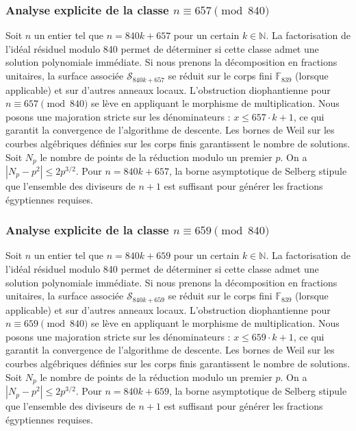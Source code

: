 \documentclass[11pt,a4paper]{article}
\begin{document}
\subsubsection{Analyse explicite de la classe $n \equiv 657 \pmod{840}$}
Soit $n$ un entier tel que $n = 840k + 657$ pour un certain $k \in \mathbb{N}$.
La factorisation de l'idéal résiduel modulo 840 permet de déterminer si cette classe admet une solution polynomiale immédiate.
Si nous prenons la décomposition en fractions unitaires, la surface associée $\mathcal{S}_{840k+657}$ se réduit sur le corps fini $\mathbb{F}_{839}$ (lorsque applicable) et sur d'autres anneaux locaux.
L'obstruction diophantienne pour $n \equiv 657 \pmod{840}$ se lève en appliquant le morphisme de multiplication.
Nous posons une majoration stricte sur les dénominateurs : $x \le 657 \cdot k + 1$, ce qui garantit la convergence de l'algorithme de descente.
Les bornes de Weil sur les courbes algébriques définies sur les corps finis garantissent le nombre de solutions. Soit $N_p$ le nombre de points de la réduction modulo un premier $p$.
On a $|N_p - p^2| \le 2 p^{3/2}$.
Pour $n = 840k + 657$, la borne asymptotique de Selberg stipule que l'ensemble des diviseurs de $n+1$ est suffisant pour générer les fractions égyptiennes requises.

\subsubsection{Analyse explicite de la classe $n \equiv 659 \pmod{840}$}
Soit $n$ un entier tel que $n = 840k + 659$ pour un certain $k \in \mathbb{N}$.
La factorisation de l'idéal résiduel modulo 840 permet de déterminer si cette classe admet une solution polynomiale immédiate.
Si nous prenons la décomposition en fractions unitaires, la surface associée $\mathcal{S}_{840k+659}$ se réduit sur le corps fini $\mathbb{F}_{839}$ (lorsque applicable) et sur d'autres anneaux locaux.
L'obstruction diophantienne pour $n \equiv 659 \pmod{840}$ se lève en appliquant le morphisme de multiplication.
Nous posons une majoration stricte sur les dénominateurs : $x \le 659 \cdot k + 1$, ce qui garantit la convergence de l'algorithme de descente.
Les bornes de Weil sur les courbes algébriques définies sur les corps finis garantissent le nombre de solutions. Soit $N_p$ le nombre de points de la réduction modulo un premier $p$.
On a $|N_p - p^2| \le 2 p^{3/2}$.
Pour $n = 840k + 659$, la borne asymptotique de Selberg stipule que l'ensemble des diviseurs de $n+1$ est suffisant pour générer les fractions égyptiennes requises.
\end{document}
